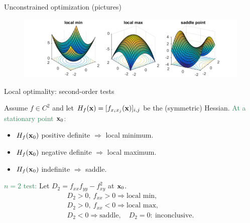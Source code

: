 \documentclass[11pt,aspectratio=169]{beamer}
\begin{document}
\begin{frame}{Unconstrained optimization (pictures)}
\begin{figure}
\includegraphics[width=5in]{img/minmaxsaddle.png}
\end{figure}
\end{frame}

\begin{frame}{Local optimality: second-order tests}

Assume \(f\in C^2\) and let \(H_f({\bf x})=[f_{x_i x_j}({\bf x})]_{i,j}\) be the (symmetric) Hessian.
\vskip 6pt
\textcolor{SeaGreen}{At a stationary point \({\bf x}_0\):}
\begin{itemize}
\item \(H_f({\bf x}_0)\) positive definite \(\Rightarrow\) local minimum.
\item \(H_f({\bf x}_0)\) negative definite \(\Rightarrow\) local maximum.
\item \(H_f({\bf x}_0)\) indefinite \(\Rightarrow\) saddle.
\end{itemize}
\vskip 6pt
\textcolor{SeaGreen}{\(n=2\) test:} Let \(D_2=f_{xx}f_{yy}-f_{xy}^2\) at \({\bf x}_0\).
\[
\begin{array}{l}
D_2>0,\ f_{xx}>0 \Rightarrow \text{local min},\\
D_2>0,\ f_{xx}<0 \Rightarrow \text{local max},\\
D_2<0 \Rightarrow \text{saddle},\quad D_2=0:\ \text{inconclusive}.
\end{array}
\]

\end{frame}
\end{document}
